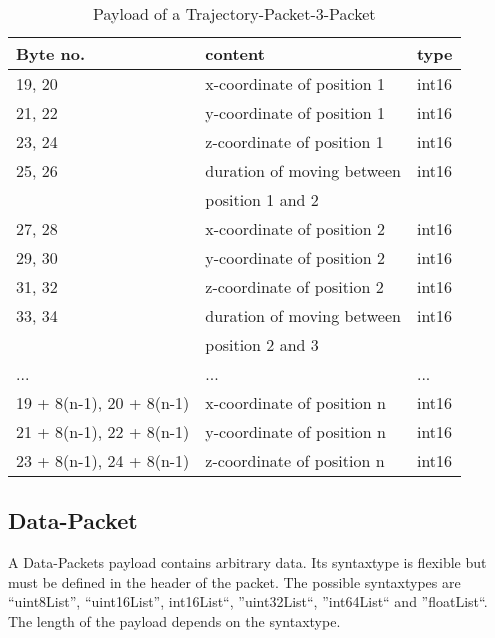 \begin{table}[htdp]
 \begin{center}
    \begin{tabular}{l|l|l}
      \textbf{Byte no.} & \textbf{content} & \textbf{type} \\
      \hline
      \hline
      19, 20 & x-coordinate of position 1 & int16 \\
      \hline
      21, 22 & y-coordinate of position 1 & int16 \\
      \hline
      23, 24 & z-coordinate of position 1 & int16 \\
      \hline
      25, 26 & duration of moving between & int16\\
      & position 1 and 2 & \\
      \hline
      27, 28 & x-coordinate of position 2 & int16 \\
      \hline
      29, 30 & y-coordinate of position 2 & int16 \\
      \hline
      31, 32 & z-coordinate of position 2 & int16 \\
      \hline
      33, 34 & duration of moving between & int16 \\
      &  position 2 and 3 & \\
      \hline
      ... & ... & ... \\
      \hline
      19 + 8(n-1), 20 + 8(n-1) & x-coordinate of position n & int16 \\
      \hline
      21 + 8(n-1), 22 + 8(n-1) & y-coordinate of position n & int16 \\
      \hline
      23 + 8(n-1), 24 + 8(n-1) & z-coordinate of position n & int16 \\
      \hline
    \end{tabular}
    \caption{Payload of a Trajectory-Packet-3-Packet}
    \label{trajectory_packet_3_payload}
  \end{center}
\end{table}

\subsection{Data-Packet}
\label{subsection:datapacket}

A Data-Packets payload contains arbitrary data. Its syntaxtype is flexible but must be defined in the header of the packet.
The possible syntaxtypes are ``uint8List'', ``uint16List'', int16List``, ''uint32List``, ''int64List`` and ''floatList``.
The length of the payload depends on the syntaxtype.
	